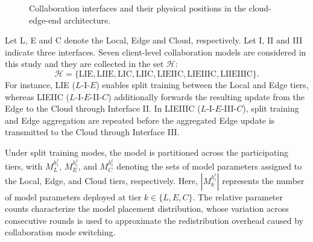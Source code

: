 \documentclass[5p,times]{elsarticle}
\theoremstyle{plain}
\theoremstyle{definition}
\theoremstyle{remark}
\begin{document}
\begin{figure}[t]

    \vspace{-0.15cm}
    \caption{Collaboration interfaces and their physical positions in the
    cloud-edge-end architecture.}
    \label{fig:collaboration_graph}
\end{figure}
Let L, E and C denote the Local, Edge and Cloud, respectively. Let I, II and III indicate three interfaces. Seven client-level collaboration models are considered in this study and they are collected in the set \(\mathcal H\):
\begin{equation}
\mathcal H=
\{\mathrm{LIE},\mathrm{LIIE},\mathrm{LIC},\mathrm{LIIC},
\mathrm{LIEIIC},\mathrm{LIEIIIC},\mathrm{LIIEIIIC}\}.
\label{eq:seven_modes}
\end{equation}
For instance, LIE (\(L\)-I-\(E\)) enables split
training between the Local and Edge tiers,
whereas LIEIIC (\(L\)-I-\(E\)-II-\(C\)) additionally forwards the resulting
update from the Edge to the Cloud through
Interface II. In LIEIIIC
(\(L\)-I-\(E\)-III-\(C\)), split training and
Edge aggregation are repeated before the
aggregated Edge update is transmitted to the
Cloud through Interface III.


Under split training modes, the model is partitioned
across the participating tiers, with
\(M_L^{h_i^t}\), \(M_E^{h_i^t}\), and
\(M_C^{h_i^t}\) denoting the sets of model
parameters assigned to the Local, Edge, and Cloud
tiers, respectively.
Here, \(|M_k^{h_i^t}|\) represents the number
of model parameters deployed at tier
\(k\in\{L,E,C\}\).
The relative parameter counts characterize the
model placement distribution, whose variation
across consecutive rounds is used to approximate
the redistribution overhead caused by
collaboration mode switching.
\end{document}
